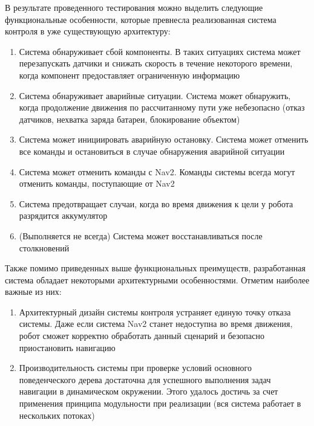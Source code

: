 В результате проведенного тестирования можно выделить следующие функциональные особенности, которые превнесла реализованная система контроля в уже существующую архитектуру:
\begin{enumerate}
    \item Система обнаруживает сбой компоненты. В таких ситуациях система может перезапускать датчики и снижать скорость в течение некоторого времени, когда компонент предоставляет ограниченную информацию
    \item Система обнаруживает аварийные ситуации. Cистема может обнаружить, когда продолжение движения по рассчитанному пути уже небезопасно (отказ датчиков, нехватка заряда батареи, блокирование объектом)
    \item Система может инициировать аварийную остановку. Система может отменить все команды и остановиться в случае обнаружения аварийной ситуации
    \item Система может отменить команды с Nav2. Команды системы всегда могут отменить команды, поступающие от Nav2
    \item Система предотвращает случаи, когда во время движения к цели у робота разрядится аккумулятор
    \item (Выполняется не всегда) Система может восстанавливаться после столкновений
\end{enumerate}

Также помимо приведенных выше функциональных преимуществ, разработанная система обладает некоторыми архитектурными особенностями. Отметим наиболее важные из них:
\begin{enumerate}
    \item Архитектурный дизайн системы контроля устраняет единую точку отказа системы. Даже если система Nav2 станет недоступна во время движения, робот сможет корректно обработать данный сценарий и безопасно приостановить навигацию
    \item Производительность системы при проверке условий основного поведенческого дерева достаточна для успешного выполнения задач навигации в динамическом окружении. Этого удалось достичь за счет применения принципа модульности при реализации (вся система работает в нескольких потоках)
\end{enumerate}

